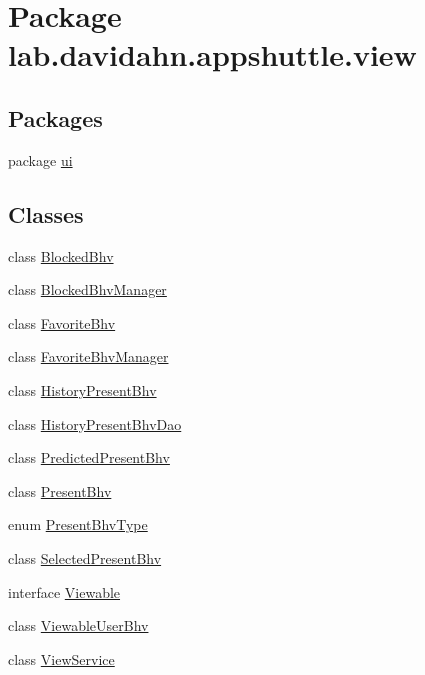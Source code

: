 \hypertarget{namespacelab_1_1davidahn_1_1appshuttle_1_1view}{\section{\-Package lab.\-davidahn.\-appshuttle.\-view}
\label{namespacelab_1_1davidahn_1_1appshuttle_1_1view}
}
\subsection*{\-Packages}
\begin{DoxyCompactItemize}
\item 
package \hyperlink{namespacelab_1_1davidahn_1_1appshuttle_1_1view_1_1ui}{ui}
\end{DoxyCompactItemize}
\subsection*{\-Classes}
\begin{DoxyCompactItemize}
\item 
class \hyperlink{classlab_1_1davidahn_1_1appshuttle_1_1view_1_1_blocked_bhv}{\-Blocked\-Bhv}
\item 
class \hyperlink{classlab_1_1davidahn_1_1appshuttle_1_1view_1_1_blocked_bhv_manager}{\-Blocked\-Bhv\-Manager}
\item 
class \hyperlink{classlab_1_1davidahn_1_1appshuttle_1_1view_1_1_favorite_bhv}{\-Favorite\-Bhv}
\item 
class \hyperlink{classlab_1_1davidahn_1_1appshuttle_1_1view_1_1_favorite_bhv_manager}{\-Favorite\-Bhv\-Manager}
\item 
class \hyperlink{classlab_1_1davidahn_1_1appshuttle_1_1view_1_1_history_present_bhv}{\-History\-Present\-Bhv}
\item 
class \hyperlink{classlab_1_1davidahn_1_1appshuttle_1_1view_1_1_history_present_bhv_dao}{\-History\-Present\-Bhv\-Dao}
\item 
class \hyperlink{classlab_1_1davidahn_1_1appshuttle_1_1view_1_1_predicted_present_bhv}{\-Predicted\-Present\-Bhv}
\item 
class \hyperlink{classlab_1_1davidahn_1_1appshuttle_1_1view_1_1_present_bhv}{\-Present\-Bhv}
\item 
enum \hyperlink{enumlab_1_1davidahn_1_1appshuttle_1_1view_1_1_present_bhv_type}{\-Present\-Bhv\-Type}
\item 
class \hyperlink{classlab_1_1davidahn_1_1appshuttle_1_1view_1_1_selected_present_bhv}{\-Selected\-Present\-Bhv}
\item 
interface \hyperlink{interfacelab_1_1davidahn_1_1appshuttle_1_1view_1_1_viewable}{\-Viewable}
\item 
class \hyperlink{classlab_1_1davidahn_1_1appshuttle_1_1view_1_1_viewable_user_bhv}{\-Viewable\-User\-Bhv}
\item 
class \hyperlink{classlab_1_1davidahn_1_1appshuttle_1_1view_1_1_view_service}{\-View\-Service}
\end{DoxyCompactItemize}
